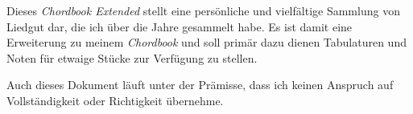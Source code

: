 \documentclass[landscape]{../TeX/Chordbook/chordbook}
\newcommand{\blankpage}{%
    \null
    \thispagestyle{empty}%
    \addtocounter{page}{-1}%
    \newpage}
\newcommand{\wpage}{\afterpage{\blankpage}}
\begin{document}

\date{\textbf{Erstellt am:} 30. August 2017 \\ \textbf{\"{U}berarbeitet am:} \today}
\clearpage


\maketitle \clearpage

\begin{center}
    { \Large
        \parbox{17cm}{
            Dieses \textit{Chordbook Extended} stellt eine pers\"{o}nliche und vielf\"{a}ltige Sammlung von Liedgut dar, die ich \"{u}ber die Jahre gesammelt habe.
            Es ist damit eine Erweiterung zu meinem \textit{Chordbook} und soll prim\"{a}r dazu dienen Tabulaturen und Noten f\"{u}r etwaige St\"{u}cke zur Verf\"{u}gung zu stellen. \par\medskip

            Auch dieses Dokument l\"{a}uft unter der Pr\"{a}misse, dass ich keinen Anspruch auf Vollst\"{a}ndigkeit oder Richtigkeit \"{u}bernehme.
        }
    }
\end{center}

\clearpage

\tableofcontents \clearpage

\columnsep=3mm

\renewcommand{\snumbgcolor}{songnr}
\renewcommand{\notebgcolor}{notes}
\renewcommand\printchord[1]{\footnotesize\sffamily\textit{\textcolor{linkcolor}{{#1}}}}

    \clearpage
        \begin{songs}{}
                                                                                                \sclearpage
                                                                                        \sclearpage
            
        \end{songs}

    \clearpage
        \begin{songs}{}
            
        \end{songs}
\end{document}
